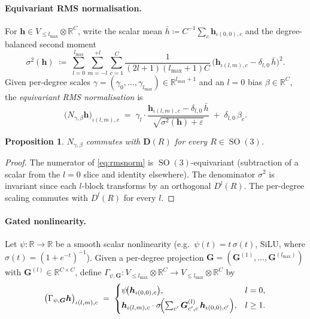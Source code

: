 \documentclass[11pt,a4paper]{article}
\DeclareMathOperator{\SO}{SO}
\newcommand{\R}{\mathbb{R}}
\newcommand{\bG}{\bm{G}}
\newcommand{\bh}{\bm{h}}
\newcommand{\bD}{\bm{D}}
\newcommand{\lmax}{l_{\max}}
\theoremstyle{plain}
\newtheorem{proposition}[theorem]{Proposition}
\theoremstyle{definition}
\theoremstyle{remark}
\begin{document}
    \paragraph{Equivariant RMS normalisation.}
    For $\bh\in V_{\le\lmax}\otimes\R^C$, write the scalar mean $\bar h\coloneqq
C^{-1}\sum_{c}\bh_{\iota(0,0),c}$ and the degree-balanced second moment
    \begin{equation}\label{eq:sigma2}
        \sigma^2(\bh) \;\coloneqq\; \sum_{l=0}^{\lmax}\sum_{m=-l}^{+l}\sum_{c=1}^{C}\frac{1}{(2l+1)(\lmax+1)C}\,\bigl(\bh_{\iota(l,m),c}-\delta_{l,0}\,\bar h\bigr)^{2}.
    \end{equation}
    Given per-degree scales $\gamma=(\gamma_0,\dots,\gamma_{\lmax})\in\R^{\lmax+1}$ and an $l=0$ bias $\beta\in\R^{C}$, the \emph{equivariant RMS normalisation} is
    \begin{equation}\label{eq:rmsnorm}
        \bigl(N_{\gamma,\beta}\bh\bigr)_{\iota(l,m),c}\;=\;\gamma_l\cdot\frac{\bh_{\iota(l,m),c}-\delta_{l,0}\,\bar h}{\sqrt{\sigma^2(\bh)+\varepsilon}} \;+\;\delta_{l,0}\,\beta_c.
    \end{equation}

    \begin{proposition}\label{prop:rms-eq}
$N_{\gamma,\beta}$ commutes with $\bD(R)$ for every $R\in\SO(3)$.
    \end{proposition}
    \begin{proof}
    The numerator of \eqref{eq:rmsnorm} is $\SO(3)$-equivariant (subtraction of a scalar from the $l=0$ slice and identity elsewhere).
    The denominator $\sigma^2$ is invariant since each $l$-block transforms by an orthogonal $D^l(R)$.
    The per-degree scaling commutes with $D^l(R)$ for every $l$.
    \end{proof}

    \paragraph{Gated nonlinearity.}
    Let $\psi:\R\to\R$ be a smooth scalar nonlinearity (e.g.\
$\psi(t)=t\,\sigma(t)$, SiLU, where $\sigma(t)=(1+e^{-t})^{-1}$). Given a
    per-degree projection $\bG=(\bG^{(1)},\dots,\bG^{(\lmax)})$ with
$\bG^{(l)}\in\R^{C\times C}$, define
$\Gamma_{\psi,\bG}:V_{\le\lmax}\otimes\R^C\to V_{\le\lmax}\otimes\R^C$ by
    \begin{equation}\label{eq:gated}
        \bigl(\Gamma_{\psi,\bG}\bh\bigr)_{\iota(l,m),c}\;=\;\begin{cases}
            \psi\!\bigl(\bh_{\iota(0,0),c}\bigr),                                                      & l=0,     \\[2pt]
            \bh_{\iota(l,m),c}\cdot\sigma\!\Bigl(\sum_{c'}\bG^{(l)}_{c',c}\,\bh_{\iota(0,0),c'}\Bigr), & l\geq 1.
        \end{cases}
    \end{equation}
\end{document}
